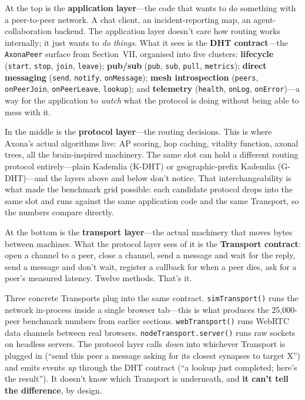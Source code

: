 \documentclass[nobib]{tufte-handout}
\begin{document}
At the top is the \textbf{application layer}---the code that wants to do something with a peer-to-peer network. A chat client, an incident-reporting map, an agent-collaboration backend. The application layer doesn't care how routing works internally; it just wants to \emph{do things}. What it sees is the \textbf{DHT contract}---the \texttt{AxonaPeer} surface from Section~VII, organised into five clusters: \textbf{lifecycle} (\texttt{start}, \texttt{stop}, \texttt{join}, \texttt{leave}); \textbf{pub/sub} (\texttt{pub}, \texttt{sub}, \texttt{pull}, \texttt{metrics}); \textbf{direct messaging} (\texttt{send}, \texttt{notify}, \texttt{onMessage}); \textbf{mesh introspection} (\texttt{peers}, \texttt{onPeerJoin}, \texttt{onPeerLeave}, \texttt{lookup}); and \textbf{telemetry} (\texttt{health}, \texttt{onLog}, \texttt{onError})---a way for the application to \emph{watch} what the protocol is doing without being able to mess with it.

In the middle is the \textbf{protocol layer}---the routing decisions. This is where Axona's actual algorithms live: AP scoring, hop caching, vitality function, axonal trees, all the brain-inspired machinery. The same slot can hold a different routing protocol entirely---plain Kademlia (K-DHT) or geographic-prefix Kademlia (G-DHT)---and the layers above and below don't notice. That interchangeability is what made the benchmark grid possible: each candidate protocol drops into the same slot and runs against the same application code and the same Transport, so the numbers compare directly.

At the bottom is the \textbf{transport layer}---the actual machinery that moves bytes between machines. What the protocol layer sees of it is the \textbf{Transport contract}: open a channel to a peer, close a channel, send a message and wait for the reply, send a message and don't wait, register a callback for when a peer dies, ask for a peer's measured latency. Twelve methods. That's it.

Three concrete Transports plug into the same contract. \texttt{simTransport()} runs the network in-process inside a single browser tab---this is what produces the 25{,}000-peer benchmark numbers from earlier sections. \texttt{webTransport()} runs WebRTC data channels between real browsers. \texttt{nodeTransport.server()} runs raw sockets on headless servers. The protocol layer calls \emph{down} into whichever Transport is plugged in (``send this peer a message asking for its closest synapses to target X'') and emits events \emph{up} through the DHT contract (``a lookup just completed; here's the result''). It doesn't know which Transport is underneath, and \textbf{it can't tell the difference}, by design.
\end{document}
